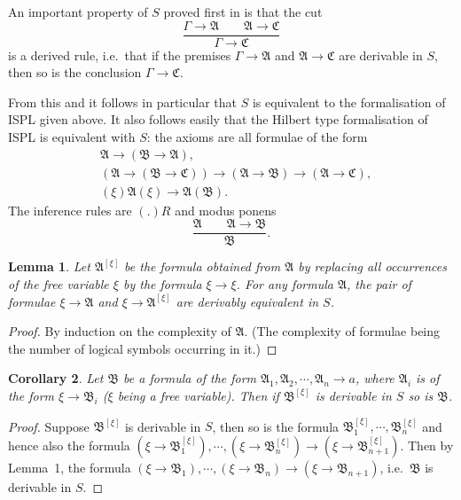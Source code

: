 \documentclass[12pt,a4paper]{article}
\newtheorem{lemma}{Lemma}
\newtheorem{corollary}[lemma]{Corollary}
\begin{document}
An important property of $S$ proved first in \cite{Prawitz1965} is that the
cut
\[
\dfrac{\Gamma \to \mathfrak{A}\qquad\mathfrak{A} \to \mathfrak{C}}
      {\Gamma \to \mathfrak{C}}
\]
is a derived rule, i.e.\ that if the premises $\Gamma \to \mathfrak{A}$ and
$\mathfrak{A} \to \mathfrak{C}$ are derivable in $S$, then so is the
conclusion $\Gamma \to \mathfrak{C}$.

From this and \cite[p.\,67]{Prawitz1965} it follows in particular that $S$ is
equivalent to the formalisation of ISPL given above. It also follows easily
that the Hilbert type formalisation of ISPL is equivalent with $S$: the axioms
are all formulae of the form
\begin{align*}
&\mathfrak{A} \to (\mathfrak{B} \to \mathfrak{A}),\\
&(\mathfrak{A} \to (\mathfrak{B} \to \mathfrak{C}))
  \to (\mathfrak{A} \to \mathfrak{B}) \to (\mathfrak{A} \to \mathfrak{C}),\\
&(\xi)\mathfrak{A}(\xi) \to \mathfrak{A}(\mathfrak{B}).
\end{align*}
The inference rules are $(.)R$ and modus ponens
\[
\dfrac{\mathfrak{A}\qquad\mathfrak{A} \to \mathfrak{B}}{\mathfrak{B}}.
\]

\begin{lemma}
Let $\mathfrak{A}^{[\xi]}$ be the formula obtained from $\mathfrak{A}$ by
replacing all occurrences of the free variable $\xi$ by the formula
$\xi \to \xi$. For any formula $\mathfrak{A}$, the pair of formulae
$\xi \to \mathfrak{A}$ and $\xi \to \mathfrak{A}^{[\xi]}$ are derivably
equivalent in $S$.
\end{lemma}

\begin{proof}
By induction on the complexity of $\mathfrak{A}$. (The complexity of formulae
being the number of logical symbols occurring in it.)
\end{proof}

\begin{corollary}
Let $\mathfrak{B}$ be a formula of the form
$\mathfrak{A}_1, \mathfrak{A}_2, \cdots, \mathfrak{A}_n \to a$, where
$\mathfrak{A}_i$ is of the form $\xi \to \mathfrak{B}_i$ ($\xi$ being a free
variable). Then if $\mathfrak{B}^{[\xi]}$ is derivable in $S$ so is
$\mathfrak{B}$.
\end{corollary}

\begin{proof}
Suppose $\mathfrak{B}^{[\xi]}$ is derivable in $S$, then so is the formula
$\mathfrak{B}_1^{[\xi]}, \cdots, \mathfrak{B}_n^{[\xi]}$ and hence also the
formula
$(\xi \to \mathfrak{B}_1^{[\xi]}), \cdots, (\xi \to \mathfrak{B}_n^{[\xi]})
 \to (\xi \to \mathfrak{B}_{n+1}^{[\xi]})$.
Then by Lemma~1, the formula
$(\xi \to \mathfrak{B}_1), \cdots, (\xi \to \mathfrak{B}_n)
 \to (\xi \to \mathfrak{B}_{n+1})$, i.e.\ $\mathfrak{B}$ is derivable in $S$.
\end{proof}
\end{document}
